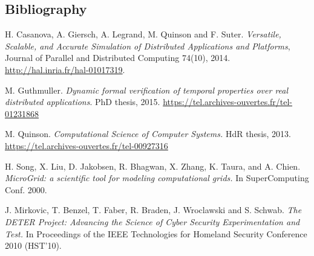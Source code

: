 \documentclass[a4paper,11pt]{article}
\begin{document}
\subsection*{Bibliography}
\begin{compactitem}
\item H. Casanova, A. Giersch, A. Legrand, M.  Quinson and F. Suter.
  \textit{Versatile, Scalable, and Accurate Simulation of Distributed
    Applications and Platforms}, Journal of Parallel and Distributed Computing
  74(10), 2014. \url{http://hal.inria.fr/hal-01017319}.
\item M. Guthmuller. \textit{Dynamic formal verification of temporal
    properties over real distributed applications}. PhD thesis,
  2015. \url{https://tel.archives-ouvertes.fr/tel-01231868}
\item M. Quinson. \textit{Computational Science of Computer Systems.}
  HdR thesis, 2013. \url{https://tel.archives-ouvertes.fr/tel-00927316}
\item H. Song, X. Liu, D. Jakobsen, R. Bhagwan, X. Zhang, K. Taura,
  and A. Chien. \textit{MicroGrid: a scientific tool for modeling
    computational grids.} In SuperComputing Conf. 2000.
\item J. Mirkovic, T. Benzel, T.  Faber, R. Braden, J. Wroclawski and
  S. Schwab. \textit{The DETER Project: Advancing the Science of Cyber
    Security Experimentation and Test.}  In Proceedings of the IEEE
  Technologies for Homeland Security Conference 2010 (HST'10).
\end{compactitem}
\end{document}
